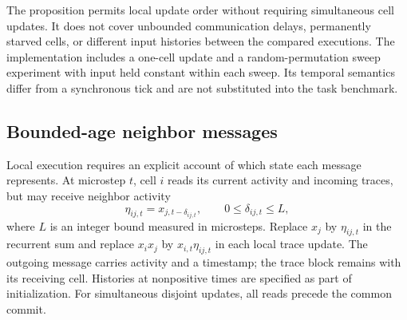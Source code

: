 \documentclass[11pt,a4paper]{article}
\theoremstyle{definition}\newtheorem{definition}[theorem]{Definition}
\begin{document}
The proposition permits local update order without requiring simultaneous cell updates. It does not cover unbounded communication delays, permanently starved cells, or different input histories between the compared executions. The implementation includes a one-cell update and a random-permutation sweep experiment with input held constant within each sweep. Its temporal semantics differ from a synchronous tick and are not substituted into the task benchmark.

\subsection{Bounded-age neighbor messages}\label{sec:delayed}
Local execution requires an explicit account of which state each message represents. At microstep $t$, cell $i$ reads its current activity and incoming traces, but may receive neighbor activity
\[
 \eta_{ij,t}=x_{j,t-\delta_{ij,t}},\qquad 0\leq\delta_{ij,t}\leq L,
\]
where $L$ is an integer bound measured in microsteps. Replace $x_j$ by $\eta_{ij,t}$ in the recurrent sum and replace $x_ix_j$ by $x_{i,t}\eta_{ij,t}$ in each local trace update. The outgoing message carries activity and a timestamp; the trace block remains with its receiving cell. Histories at nonpositive times are specified as part of initialization. For simultaneous disjoint updates, all reads precede the common commit.
\end{document}
